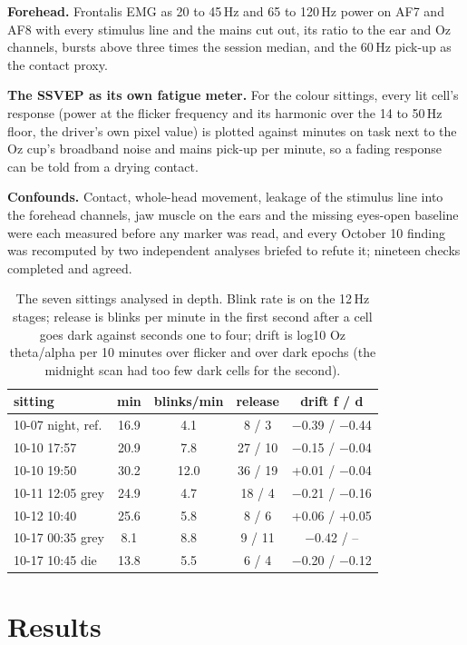 \documentclass[conference]{IEEEtran}
\begin{document}
\textbf{Forehead.} Frontalis EMG as 20 to 45\,Hz and 65 to 120\,Hz power on AF7 and AF8 with every stimulus line and the mains cut out, its ratio to the ear and Oz channels, bursts above three times the session median, and the 60\,Hz pick-up as the contact proxy.

\textbf{The SSVEP as its own fatigue meter.} For the colour sittings, every lit cell's response (power at the flicker frequency and its harmonic over the 14 to 50\,Hz floor, the driver's own pixel value) is plotted against minutes on task next to the Oz cup's broadband noise and mains pick-up per minute, so a fading response can be told from a drying contact.

\textbf{Confounds.} Contact, whole-head movement, leakage of the stimulus line into the forehead channels, jaw muscle on the ears and the missing eyes-open baseline were each measured before any marker was read, and every October 10 finding was recomputed by two independent analyses briefed to refute it; nineteen checks completed and agreed.

\begin{table}[t]
\caption{The seven sittings analysed in depth. Blink rate is on the 12\,Hz stages; release is blinks per minute in the first second after a cell goes dark against seconds one to four; drift is log10 Oz theta/alpha per 10 minutes over flicker and over dark epochs (the midnight scan had too few dark cells for the second).}
\label{tab:sittings}
\centering
\scriptsize
\setlength{\tabcolsep}{4pt}
\begin{tabular}{lcccc}
\toprule
sitting & min & blinks/min & release & drift f / d \\
\midrule
10-07 night, ref. & 16.9 & 4.1 & 8 / 3 & $-$0.39 / $-$0.44 \\
10-10 17:57 & 20.9 & 7.8 & 27 / 10 & $-$0.15 / $-$0.04 \\
10-10 19:50 & 30.2 & 12.0 & 36 / 19 & +0.01 / $-$0.04 \\
10-11 12:05 grey & 24.9 & 4.7 & 18 / 4 & $-$0.21 / $-$0.16 \\
10-12 10:40 & 25.6 & 5.8 & 8 / 6 & +0.06 / +0.05 \\
10-17 00:35 grey & 8.1 & 8.8 & 9 / 11 & $-$0.42 / -- \\
10-17 10:45 die & 13.8 & 5.5 & 6 / 4 & $-$0.20 / $-$0.12 \\
\bottomrule
\end{tabular}
\end{table}

\section{Results}
\end{document}
